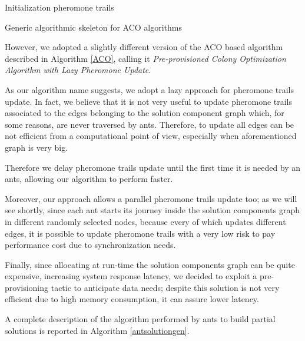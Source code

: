 \documentclass[12pt,a4paper]{report}
\begin{document}
\begin{algorithm}\label{ACO}
	Initialization pheromone trails\;
	\caption{Generic algorithmic skeleton for ACO algorithms}
\end{algorithm}

However, we adopted a slightly different version of the ACO based algorithm described in Algorithm \ref{ACO}, calling it \textit{Pre-provisioned Colony Optimization Algorithm with Lazy Pheromone Update}.

As our algorithm name suggests, we adopt a lazy approach for pheromone trails update. In fact, we believe that it is not very useful to update pheromone trails associated to the edges belonging to the solution component graph which, for some reasons, are never traversed by ants. Therefore, to update all edges can be not efficient from a computational point of view, especially when aforementioned graph is very big.

Therefore we delay pheromone trails update until the first time it is needed by an ants, allowing our algorithm to perform faster. 

Moreover, our approach allows a parallel pheromone trails update too; as we will see shortly, since each ant starts its journey inside the solution components graph in different randomly selected nodes, because every of which updates different edges, it is possible to update pheromone trails with a very low risk to pay performance cost due to synchronization needs.

Finally, since allocating at run-time the solution components graph can be quite expensive, increasing system response latency, we decided to exploit a pre-provisioning tactic\cite{Tactics} to anticipate data needs; despite this solution is not very efficient due to high memory consumption, it can assure lower latency.

A complete description of the algorithm performed by ants to build partial solutions is reported in Algorithm \ref{antsolutiongen}.
\end{document}
